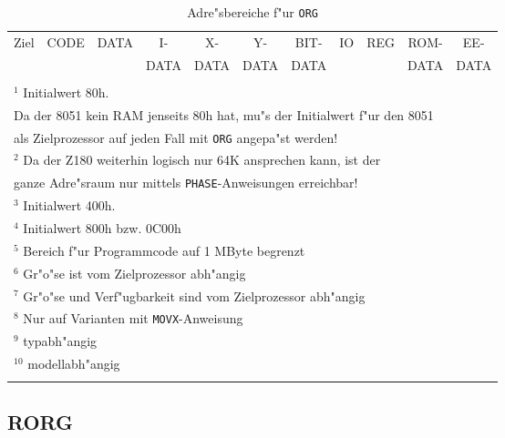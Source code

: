 \documentclass[12pt,a4paper,twoside]{report}
\makeatletter
\newcommand{\tty}[1]{{\tt #1}}
\newcommand{\tin}[1]{{\scriptsize #1}}
\newcommand{\ttindex}[1]{\index{#1@{\tt #1}}}
\makeatother
\begin{document}
\hfuzz=60pt
\begin{longtable}{|l|c|c|c|c|c|c|c|c|c|c|}
\hline
\tin{Ziel} & \tin{CODE} & \tin{DATA} & \tin{I-}   & \tin{X-}   & \tin{Y-}   & \tin{BIT-} & \tin{IO} & \tin{REG} & \tin{ROM-} & \tin{EE-} \\
           &            &            & \tin{DATA} & \tin{DATA} & \tin{DATA} & \tin{DATA} &          &           & \tin{DATA} & \tin{DATA} \\
\hline
\hline
\endhead

\\ \hline
\multicolumn{11}{|l|}{$^{1}$ Initialwert 80h. } \\
\multicolumn{11}{|l|}{  Da der 8051 kein RAM jenseits 80h hat, mu"s der Initialwert f"ur den 8051} \\
\multicolumn{11}{|l|}{  als Zielprozessor auf jeden Fall mit \tty{ORG} angepa"st werden!} \\
\hline
\multicolumn{11}{|l|}{$^{2}$ Da der Z180 weiterhin logisch nur 64K ansprechen kann, ist der} \\
\multicolumn{11}{|l|}{ganze Adre"sraum nur mittels \tty{PHASE}-Anweisungen erreichbar!} \\
\hline
\multicolumn{11}{|l|}{$^{3}$ Initialwert 400h.} \\
\hline
\multicolumn{11}{|l|}{$^{4}$ Initialwert 800h bzw. 0C00h} \\
\hline
\multicolumn{11}{|l|}{$^{5}$ Bereich f"ur Programmcode auf 1 MByte begrenzt} \\
\hline
\multicolumn{11}{|l|}{$^{6}$ Gr"o"se ist vom Zielprozessor abh"angig} \\
\hline
\multicolumn{11}{|l|}{$^{7}$ Gr"o"se und Verf"ugbarkeit sind vom Zielprozessor abh"angig} \\
\hline
\multicolumn{11}{|l|}{$^{8}$ Nur auf Varianten mit \tty{MOVX}-Anweisung} \\
\hline
\multicolumn{11}{|l|}{$^{9}$ typabh"angig} \\
\hline
\multicolumn{11}{|l|}{$^{10}$ modellabh"angig} \\
\hline
\caption{Adre"sbereiche f"ur \tty{ORG}}
\label{TabORG}
\end{longtable}
\hfuzz=0pt


\subsection{RORG}
\label{SectRORG}
\ttindex{RORG}
\end{document}
